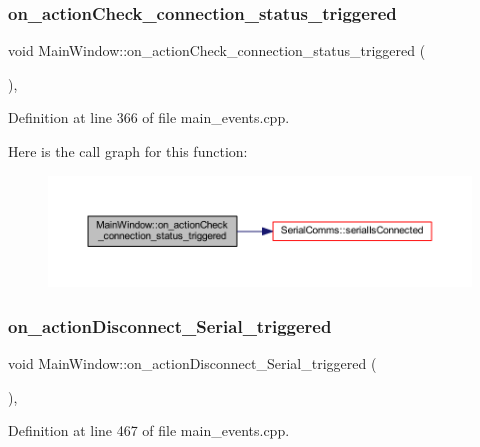 \subsubsection{\texorpdfstring{on\_actionCheck\_connection\_status\_triggered}{on\_actionCheck\_connection\_status\_triggered}}
{\footnotesize\ttfamily void Main\+Window\+::on\+\_\+action\+Check\+\_\+connection\+\_\+status\+\_\+triggered (\begin{DoxyParamCaption}{ }\end{DoxyParamCaption})\hspace{0.3cm}{\ttfamily [private]}, {\ttfamily [slot]}}



Definition at line 366 of file main\+\_\+events.\+cpp.

Here is the call graph for this function\+:
\nopagebreak
\begin{figure}[H]
\begin{center}
\leavevmode
\includegraphics[width=350pt]{classMainWindow_aa6925b9f63240473ebb0baeb0caf51d5_cgraph}
\end{center}
\end{figure}
\mbox{\label{classMainWindow_adac02082b520624b82e63d66eb2f1f57}} 
\subsubsection{\texorpdfstring{on\_actionDisconnect\_Serial\_triggered}{on\_actionDisconnect\_Serial\_triggered}}
{\footnotesize\ttfamily void Main\+Window\+::on\+\_\+action\+Disconnect\+\_\+\+Serial\+\_\+triggered (\begin{DoxyParamCaption}{ }\end{DoxyParamCaption})\hspace{0.3cm}{\ttfamily [private]}, {\ttfamily [slot]}}



Definition at line 467 of file main\+\_\+events.\+cpp.

